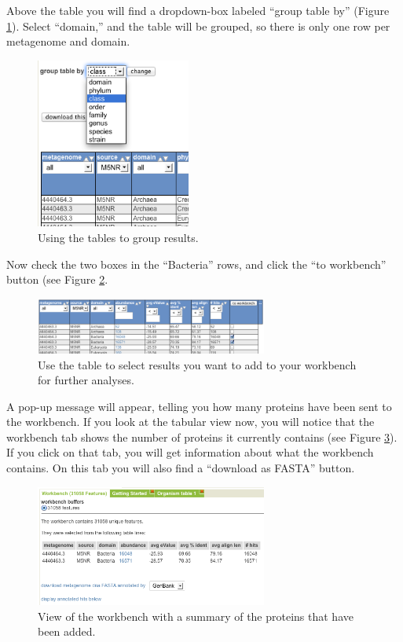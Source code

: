 \documentclass[12pt,fullpage]{report}
\begin{document}
Above the table you will find a dropdown-box labeled ``group table by'' (Figure \ref{fig:table-group-by-class}). Select ``domain,'' and the table will be grouped, so there is only one row per metagenome and domain.
\begin{figure}[ht]
\begin{center}
\includegraphics[width=2in]{Images/table-group-by-class.png}
\end{center}
\caption{
Using the tables to group results.
}
\label{fig:table-group-by-class}
\end{figure}

Now check the two boxes in the ``Bacteria'' rows, and click the ``to workbench'' button (see Figure \ref{fig:table-organism-abundance}.

\begin{figure}
\begin{center}
\includegraphics[width=3in]{Images/table-organism-abundance.png}
\end{center}
\caption{
Use the table to select results you want to add to your workbench for further analyses.
}
\label{fig:table-organism-abundance}
\end{figure}

A pop-up message will appear, telling you how many proteins have been sent to the workbench. If you look at the tabular view now, you will notice that the workbench tab shows the number of proteins it currently contains (see Figure \ref{fig:workbench}). If you click on that tab, you will get information about what the workbench contains. On this tab you will also find a ``download as FASTA'' button.


\begin{figure}
\begin{center}
\includegraphics[width=3in]{Images/workbench.png}
\end{center}
\caption{
View of the workbench with a summary of the proteins that have been added.
}
\label{fig:workbench}
\end{figure}
\end{document}
